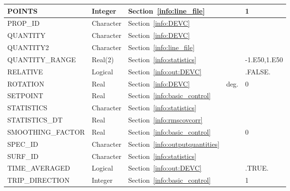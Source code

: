 \documentclass[11pt]{book}
\begin{document}
\begin{longtable}{@{\extracolsep{\fill}}|l|l|l|l|l|}
{\ct POINTS}                & Integer         & Section~\ref{info:line_file}                                    &       & 1             \\ \hline
{\ct PROP\_ID}              & Character       & Section~\ref{info:DEVC}                                         &       &               \\ \hline
{\ct QUANTITY}              & Character       & Section~\ref{info:DEVC}                                         &       &               \\ \hline
{\ct QUANTITY2}             & Character       & Section~\ref{info:line_file}                                    &       &               \\ \hline
{\ct QUANTITY\_RANGE}       & Real(2)         & Section~\ref{info:statistics}                                   &       & -1.E50,1.E50  \\ \hline
{\ct RELATIVE}              & Logical         & Section~\ref{info:out:DEVC}                                     &       & {\ct .FALSE.} \\ \hline
{\ct ROTATION}              & Real            & Section~\ref{info:DEVC}                                         & deg.  & 0             \\ \hline
{\ct SETPOINT}              & Real            & Section~\ref{info:basic_control}                                &       &               \\ \hline
{\ct STATISTICS}            & Character       & Section~\ref{info:statistics}                                &       &               \\ \hline
{\ct STATISTICS\_DT}        & Real            & Section~\ref{info:rmscovcorr}                                &       &               \\ \hline
{\ct SMOOTHING\_FACTOR}     & Real            & Section~\ref{info:basic_control}                                &       & 0             \\ \hline
{\ct SPEC\_ID}              & Character       & Section~\ref{info:outputquantities}                             &       &               \\ \hline
{\ct SURF\_ID}              & Character       & Section~\ref{info:statistics}                                   &       &               \\ \hline
{\ct TIME\_AVERAGED}        & Logical         & Section~\ref{info:out:DEVC}                                     &       &  {\ct .TRUE.} \\ \hline
{\ct TRIP\_DIRECTION}       & Integer         & Section~\ref{info:basic_control}                                &       &  1            \\ \hline

\end{longtable}
\end{document}
